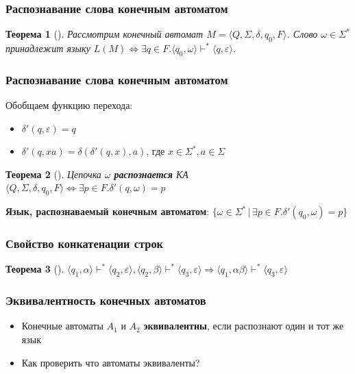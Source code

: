\documentclass{beamer}
\newtheorem{rutheorem}{Теорема}
\begin{document}
\begin{frame}[fragile]
  \transwipe[direction=90]
  \frametitle{Распознавание слова конечным автоматом}
  \begin{rutheorem}[]
   Рассмотрим конечный автомат  $M = \langle Q , \Sigma , \delta , q_0 , F \rangle$. 
   Слово $\omega \in \Sigma ^*$ принадлежит языку $L(M) \Leftrightarrow \exists q \in F.\langle q_0 , \omega \rangle \vdash^* \langle q , \varepsilon \rangle$.
  \end{rutheorem}  
\end{frame} 
  
\begin{frame}[fragile]
  \transwipe[direction=90]
  \frametitle{Распознавание слова конечным автоматом}
   Обобщаем функцию перехода:
 
      \begin{itemize}
        \item $\delta' (q, \varepsilon) = q$
        \item $\delta' (q, xa) = \delta(\delta'(q, x), a)$, где $x \in \Sigma^*, a \in \Sigma$
      \end{itemize}

  \begin{rutheorem}[]   
     Цепочка $\omega$ \textbf{распознается} КА $\langle Q, \Sigma, \delta, q_0, F \rangle \Leftrightarrow \exists p \in F. \delta'(q, \omega) = p$
  \end{rutheorem}  
   
   \textbf{Язык, распознаваемый конечным автоматом}: $\{ \omega \in \Sigma^* \, | \, \exists p \in F.\delta'(q_0, \omega) = p \}$
\end{frame}


\begin{frame}[fragile]
  \transwipe[direction=90]
  \frametitle{Свойство конкатенации строк}
  \begin{rutheorem}[]   
    $\langle q_1 , \alpha \rangle \vdash^* \langle q_2 , \varepsilon \rangle, \langle q_2 , \beta \rangle \vdash^* \langle q_3 , \varepsilon \rangle \Rightarrow \langle q_1 , \alpha \beta \rangle \vdash^* \langle q_3 , \varepsilon \rangle$
  \end{rutheorem}
\end{frame}


\begin{frame}[fragile]
  \transwipe[direction=90]
  \frametitle{Эквивалентность конечных автоматов}
  \begin{itemize}
    \item Конечные автоматы $A_1$ и $A_2$ \textbf{эквивалентны}, если распознают один и тот же язык
    \item Как проверить что автоматы эквиваленты?
  \end{itemize}
\end{frame}
\end{document}
